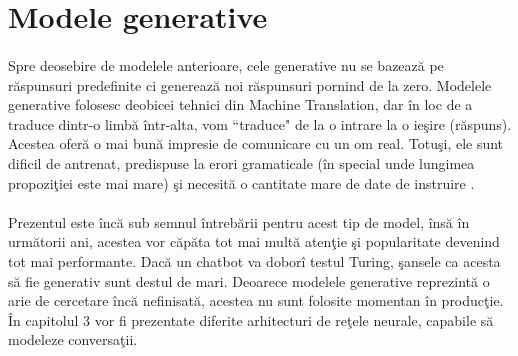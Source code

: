 \section{Modele generative}

\paragraph{}
Spre deosebire de modelele anterioare, cele generative nu se bazeaz\u a pe r\u aspunsuri predefinite ci genereaz\u a noi r\u aspunsuri pornind de la zero. Modelele generative folosesc deobicei tehnici din Machine Translation, dar \^ in loc de a traduce dintr-o limb\u a \^ intr-alta, vom ``traduce" de la o intrare la o ie\c sire (r\u aspuns). Acestea ofer\u a o mai bun\u a impresie de comunicare cu un om real. Totu\c si, ele sunt dificil de antrenat, predispuse la erori gramaticale (\^ in special unde lungimea propozi\c tiei este mai mare) \c si necesit\u a o cantitate mare de date de instruire \cite{wildml-chatbots}.

\paragraph{}
Prezentul este \^ inc\u a sub semnul \^ intreb\u arii pentru acest tip de model, \^ ins\u a \^ in urm\u atorii ani, acestea vor c\u ap\u ata tot mai mult\u a aten\c tie \c si popularitate devenind tot mai performante. Dac\u a un chatbot va dobor\^ i testul Turing, \c sansele ca acesta s\u a fie generativ sunt destul de mari. Deoarece modelele generative reprezint\u a o arie de cercetare \^ inc\u a nefinisat\u a, acestea nu sunt folosite momentan \^ in produc\c tie. \^ In capitolul 3 vor fi prezentate diferite arhitecturi de re\c tele neurale, capabile s\u a modeleze conversa\c tii.